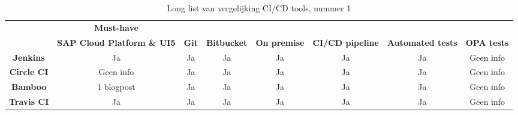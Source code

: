             
            \begin{landscape}
                \begin{table}[]
                    \centering
                    \begin{tabular}{c|c|cccccc}
                        \cline{2-2}
                        \textbf{} & \textbf{Must-have} & \textbf{} & \textbf{} & \textbf{} & \textbf{} & \textbf{} & \textbf{} \\ \cline{2-8} 
                        & \textbf{SAP Cloud Platform \& UI5} & \multicolumn{1}{c|}{\textbf{Git}} & \multicolumn{1}{c|}{\textbf{Bitbucket}} & \multicolumn{1}{c|}{\textbf{On premise}} & \multicolumn{1}{c|}{\textbf{CI/CD pipeline}} & \multicolumn{1}{c|}{\textbf{Automated tests}} & \multicolumn{1}{c|}{\textbf{OPA tests}} \\ \hline
                        \multicolumn{1}{|c|}{\textbf{Jenkins}} & Ja & \multicolumn{1}{c|}{Ja} & \multicolumn{1}{c|}{Ja} & \multicolumn{1}{c|}{Ja} & \multicolumn{1}{c|}{Ja} & \multicolumn{1}{c|}{Ja} & \multicolumn{1}{c|}{Geen info} \\ \hline
                        \multicolumn{1}{|c|}{\textbf{Circle CI}} & Geen info & \multicolumn{1}{c|}{Ja} & \multicolumn{1}{c|}{Ja} & \multicolumn{1}{c|}{Ja} & \multicolumn{1}{c|}{Ja} & \multicolumn{1}{c|}{Ja} & \multicolumn{1}{c|}{Geen info} \\ \hline
                        \multicolumn{1}{|c|}{\textbf{Bamboo}} & 1 blogpost & \multicolumn{1}{c|}{Ja} & \multicolumn{1}{c|}{Ja} & \multicolumn{1}{c|}{Ja} & \multicolumn{1}{c|}{Ja} & \multicolumn{1}{c|}{Ja} & \multicolumn{1}{c|}{Geen info} \\ \hline
                        \multicolumn{1}{|c|}{\textbf{Travis CI}} & Ja & \multicolumn{1}{c|}{Ja} & \multicolumn{1}{c|}{Ja} & \multicolumn{1}{c|}{Ja} & \multicolumn{1}{c|}{Ja} & \multicolumn{1}{c|}{Ja} & \multicolumn{1}{c|}{Geen info} \\ \hline
                    \end{tabular}
                    \caption[Long list CI/CD tools, nummer 1]{Long list van vergelijking CI/CD tools, nummer 1}
                    \label{tab:long-list1}
                \end{table}
            \end{landscape}
        
